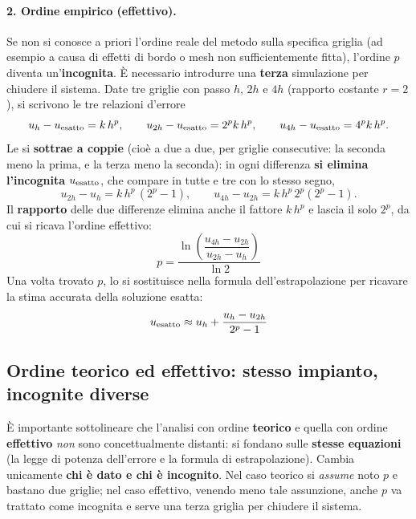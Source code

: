 \paragraph{2. Ordine empirico (effettivo).}
Se non si conosce a priori l'ordine reale del metodo sulla specifica griglia (ad esempio
a causa di effetti di bordo o mesh non sufficientemente fitta), l'ordine $p$ diventa
un'\textbf{incognita}. È necessario introdurre una \textbf{terza} simulazione per chiudere
il sistema. Date tre griglie con passo $h$, $2h$ e $4h$ (rapporto costante $r=2$), si scrivono le
tre relazioni d'errore
\begin{equation}
  u_h - u_{\rm esatto}=k\,h^p,\qquad
  u_{2h}-u_{\rm esatto}=2^p k\,h^p,\qquad
  u_{4h}-u_{\rm esatto}=4^p k\,h^p .
\end{equation}
Le si \textbf{sottrae a coppie} (cioè a due a due, per griglie consecutive: la seconda meno la
prima, e la terza meno la seconda): in ogni differenza \textbf{si elimina l'incognita}
$u_{\rm esatto}$, che compare in tutte e tre con lo stesso segno,
\begin{equation}
  u_{2h}-u_h = k\,h^p\,(2^p-1),\qquad
  u_{4h}-u_{2h} = k\,h^p\,2^p(2^p-1).
\end{equation}
Il \textbf{rapporto} delle due differenze elimina anche il fattore $k\,h^p$ e lascia il solo $2^p$,
da cui si ricava l'ordine effettivo:
\begin{equation}
  p = \frac{\ln\!\left(\dfrac{u_{4h}-u_{2h}}{u_{2h}-u_h}\right)}{\ln 2}
\end{equation}
Una volta trovato $p$, lo si sostituisce nella formula dell'estrapolazione per ricavare
la stima accurata della soluzione esatta:
\begin{equation}
  u_{\rm esatto} \approx u_h + \frac{u_h-u_{2h}}{2^p - 1}
\end{equation}

\subsection{Ordine teorico ed effettivo: stesso impianto, incognite diverse}

È importante sottolineare che l'analisi con ordine \textbf{teorico} e quella con ordine
\textbf{effettivo} \emph{non} sono concettualmente distanti: si fondano sulle
\textbf{stesse equazioni} (la legge di potenza dell'errore e la formula di
estrapolazione). Cambia unicamente \textbf{chi è dato e chi è incognito}. Nel caso
teorico si \emph{assume} noto $p$ e bastano due griglie; nel caso effettivo, venendo
meno tale assunzione, anche $p$ va trattato come incognita e serve una terza griglia per
chiudere il sistema.

